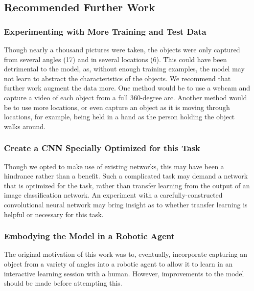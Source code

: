 \documentclass{article}
\begin{document}
\subsection{Recommended Further Work}

\subsubsection{Experimenting with More Training and Test Data}

Though nearly a thousand pictures were taken, the objects were only captured from several angles (17) and in several locations (6). This could have been detrimental to the model, as, without enough training examples, the model may not learn to abstract the characteristics of the objects. We recommend that further work augment the data more. One method would be to use a webcam and capture a video of each object from a full 360-degree arc. Another method would be to use more locations, or even capture an object as it is moving through locations, for example, being held in a hand as the person holding the object walks around.

\subsubsection{Create a CNN Specially Optimized for this Task}

Though we opted to make use of existing networks, this may have been a hindrance rather than a benefit. Such a complicated task may demand a network that is optimized for the task, rather than transfer learning from the output of an image classification network. An experiment with a carefully-constructed convolutional neural network may bring insight as to whether transfer learning is helpful or necessary for this task.

\subsubsection{Embodying the Model in a Robotic Agent}

The original motivation of this work was to, eventually, incorporate capturing an object from a variety of angles into a robotic agent to allow it to learn in an interactive learning session with a human. However, improvements to the model should be made before attempting this.
\end{document}
